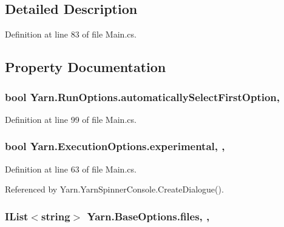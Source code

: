 \subsection{Detailed Description}


Definition at line 83 of file Main.\-cs.



\subsection{Property Documentation}
\hypertarget{a00157_ae21d271c37dabee023771a951f6e774e}{
\subsubsection[{automatically\-Select\-First\-Option}]{\setlength{\rightskip}{0pt plus 5cm}bool Yarn.\-Run\-Options.\-automatically\-Select\-First\-Option\hspace{0.3cm}{\ttfamily [get]}, {\ttfamily [set]}}}\label{a00157_ae21d271c37dabee023771a951f6e774e}


Definition at line 99 of file Main.\-cs.

\hypertarget{a00103_ad97950e47ce2aaeb598295b7c3c44b13}{
\subsubsection[{experimental}]{\setlength{\rightskip}{0pt plus 5cm}bool Yarn.\-Execution\-Options.\-experimental\hspace{0.3cm}{\ttfamily [get]}, {\ttfamily [set]}, {\ttfamily [inherited]}}}\label{a00103_ad97950e47ce2aaeb598295b7c3c44b13}


Definition at line 63 of file Main.\-cs.



Referenced by Yarn.\-Yarn\-Spinner\-Console.\-Create\-Dialogue().

\hypertarget{a00041_aa93cbb1bc1d5328e0a417012621e92d2}{
\subsubsection[{files}]{\setlength{\rightskip}{0pt plus 5cm}I\-List$<$string$>$ Yarn.\-Base\-Options.\-files\hspace{0.3cm}{\ttfamily [get]}, {\ttfamily [set]}, {\ttfamily [inherited]}}}\label{a00041_aa93cbb1bc1d5328e0a417012621e92d2}


